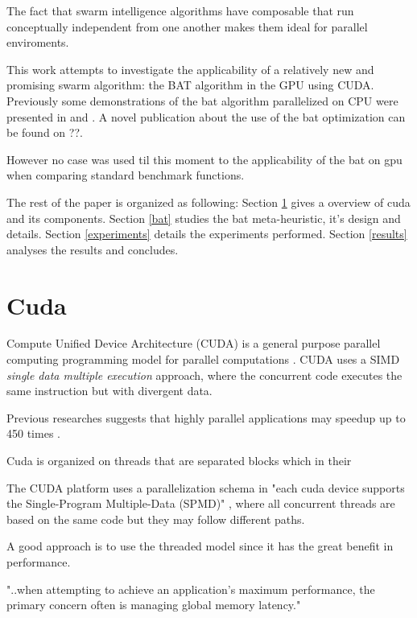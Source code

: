 \documentclass[conference]{IEEEtran}
\begin{document}
The fact that swarm intelligence algorithms have composable that run
conceptually independent from one another makes them ideal for parallel
enviroments.

This work attempts to investigate the applicability of a relatively new
and promising swarm algorithm: the BAT algorithm in the GPU using CUDA.
Previously some demonstrations of the bat algorithm parallelized on CPU
were presented in \cite{paralellCPUFirst} and \cite{paralellCPU}. A
novel publication about the use of the bat optimization can be found on
??.

However no case was used til this moment to the applicability of the bat on gpu when comparing standard benchmark functions.

The rest of the paper is organized as following: Section \ref{cuda} gives a overview of cuda and its components. Section \ref{bat} studies 
the bat meta-heuristic, it's design and details. Section \ref{experiments} details the experiments performed. Section \ref{results} analyses the results and concludes.

\section{Cuda} \label{cuda}%

Compute Unified Device Architecture (CUDA) is a general purpose
parallel computing programming model for parallel computations \cite{cudaDefinition}. CUDA    
uses a SIMD \textit{single data multiple execution} approach, where the 
concurrent code executes the same instruction but with divergent data.  

Previous researches suggests that highly parallel
applications may speedup up to 450 times \cite{cuda_optimizations}.


Cuda is organized on threads that are separated blocks which in their

The CUDA platform uses a parallelization schema in "each cuda
device supports the Single-Program Multiple-Data (SPMD)"
\cite{cuda_optimizations}, where all concurrent threads are based on the
same code but they may follow different paths.

A good approach is to use the threaded model since it has the great benefit in performance.

"..when attempting to achieve an application's maximum
performance, the primary concern often is managing global memory
latency." \cite{cuda_optimizations}
\end{document}
